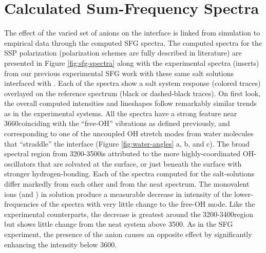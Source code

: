 \section{Calculated Sum-Frequency Spectra}

The effect of the varied set of anions on the \ctcwat interface is linked from simulation to empirical data through the computed SFG spectra. The computed spectra for the SSP polarization (polarization schemes are fully described in literature\cite{Lambert2005}) are presented in Figure \ref{fig:sfg-spectra} along with the experimental spectra (inserts) from our previous experimental SFG work with these same salt solutions interfaced with \ctc.\cite{McFearin2009} Each of the spectra show a salt system response (colored traces) overlayed on the reference \ctcwat spectrum (black or dashed-black traces). On first look, the overall computed intensities and lineshapes follow remarkably similar trends as in the experimental systems. All the spectra have a strong feature near 3660\cm coinciding with the ``free-OH'' vibrations as defined previously,\cite{McFearin2009} and corresponding to one of the uncoupled OH stretch modes from water molecules that ``straddle'' the interface (Figure \ref{fig:water-angles} a, b, and c).\cite{McFearin2009} The broad spectral region from 3200-3500\cm is attributed to the more highly-coordinated OH-oscillators that are solvated at the surface, or just beneath the surface with stronger hydrogen-bonding. Each of the spectra computed for the salt-solutions differ markedly from each other and from the neat \ctcwat spectrum. The monovalent ions (\cl and \nit) in solution produce a measurable decrease in intensity of the lower-frequencies of the spectra with very little change to the free-OH mode. Like the experimental counterparts, the decrease is greatest around the 3200-3400\cm region but shows little change from the neat \ctcwat system above 3500\cm. As in the SFG experiment, the presence of the \sul anion causes an opposite effect by significantly enhancing the intensity below 3600\cm.

